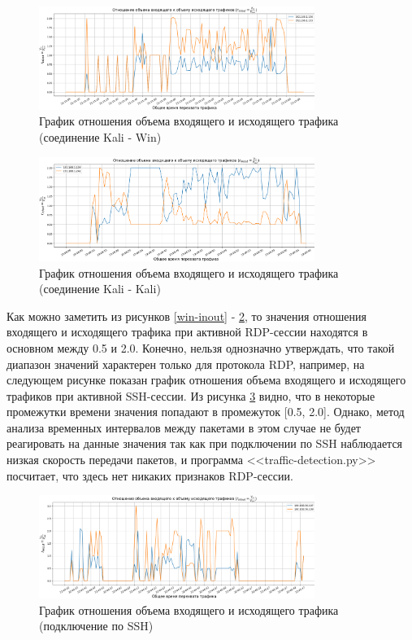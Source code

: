\documentclass[bachelor, och, coursework]{SCWorks}
\begin{document}
\begin{figure}[H]
  \centering
  \includegraphics[width=0.8\textwidth]{photo/inout-kalwin.png}
  \caption{График отношения объема входящего и исходящего трафика (соединение Kali - Win)}
  \label{kalwin-inout}
\end{figure}


\begin{figure}[H]
  \centering
  \includegraphics[width=0.8\textwidth]{photo/inout-kali.png}
  \caption{График отношения объема входящего и исходящего трафика (соединение Kali - Kali)}
  \label{kali-inout}
\end{figure}

Как можно заметить из рисунков \ref{win-inout} - \ref{kali-inout}, то значения отношения входящего и исходящего трафика
при активной RDP-сессии находятся в основном между 0.5 и 2.0. Конечно, нельзя однозначно утверждать, что такой диапазон
значений характерен только для протокола RDP, например, на следующем рисунке показан график отношения объема входящего и
исходящего трафиков при активной SSH-сессии. Из рисунка \ref{ssh-inout}
видно, что в некоторые промежутки времени значения попадают в промежуток [0.5, 2.0]. Однако, метод анализа временных интервалов между пакетами
в этом случае не будет реагировать на данные значения так как при подключении по SSH наблюдается низкая скорость передачи пакетов,
и программа <<traffic-detection.py>> посчитает, что здесь нет никаких признаков RDP-сессии.

\begin{figure}[H]
  \centering
  \includegraphics[width=0.8\textwidth]{photo/inout-ssh.png}
  \caption{График отношения объема входящего и исходящего трафика (подключение по SSH)}
  \label{ssh-inout}
\end{figure}
\end{document}
